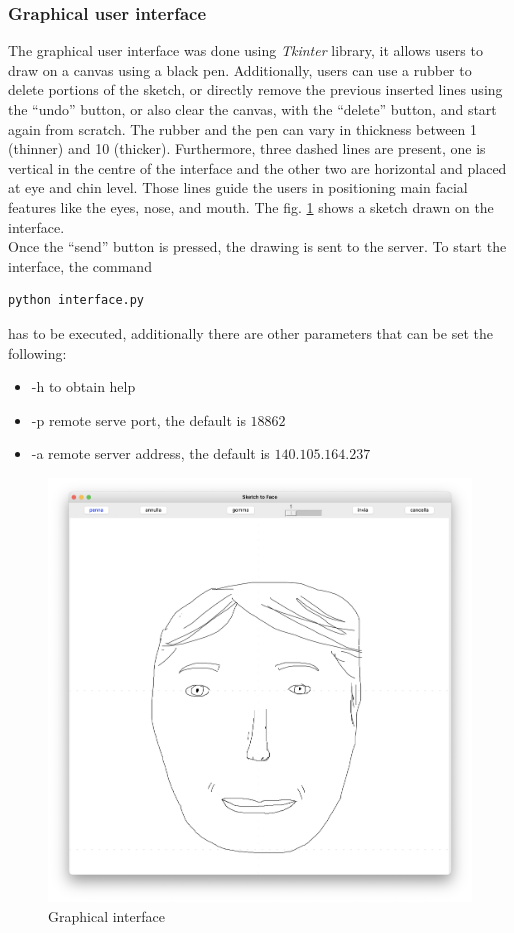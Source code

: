 \subsubsection{Graphical user interface}
The graphical user interface was done using \textit{Tkinter} library, it allows users to draw on a canvas using a black pen. Additionally, users can use a rubber to delete portions of the sketch, or directly remove the previous inserted lines using the “undo” button, or also clear the canvas, with the “delete” button, and start again from scratch. The rubber and the pen can vary in thickness between 1 (thinner) and 10 (thicker). Furthermore, three dashed lines are present, one is vertical in the centre of the interface and the other two are horizontal and placed at eye and chin level. Those lines guide the users in positioning main facial features like the eyes, nose, and mouth. The fig. \ref{fig:Graphical interface} shows a sketch drawn on the interface.\\
Once the “send” button is pressed, the drawing is sent to the server.
To start the interface, the command 
\begin{lstlisting}[numbers=none]
    python interface.py
\end{lstlisting} 
has to be executed, additionally there are other parameters that can be set the following:
\begin{itemize}
\label{list:optional commands}
    \item -h to obtain help
    \item -p remote serve port, the default is $18862$
    \item -a remote server address, the default is $140.105.164.237$
\end{itemize}
\begin{figure}[htbp]
\centering
  \includegraphics[scale=0.15]{figures/interface.png}
  \caption{Graphical interface}
  \label{fig:Graphical interface}
\end{figure}

